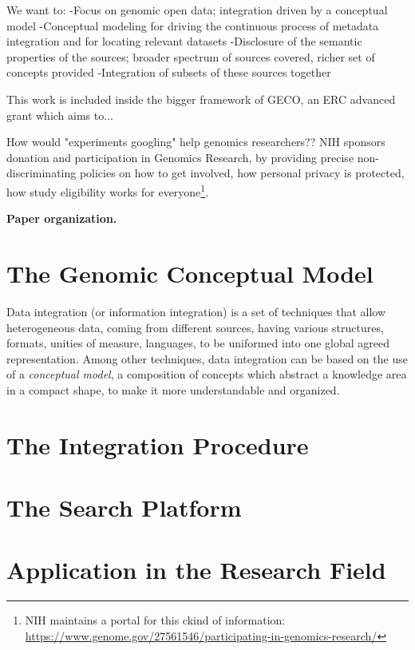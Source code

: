 \documentclass[journal]{IEEEtran}
\begin{document}
We want to:
-Focus on genomic open data; integration driven by a conceptual model
-Conceptual modeling for driving the continuous process of metadata integration and for locating relevant datasets
-Disclosure of the semantic properties of the sources; broader spectrum of sources covered, richer set of concepts provided
-Integration of subsets of these sources together

This work is included inside the bigger framework of GECO, an ERC advanced grant which aims to...

How would "experiments googling" help genomics researchers??
NIH sponsors donation and participation in Genomics Research, by providing precise non-discriminating policies on how to get involved, how personal privacy is protected, how study eligibility works for everyone\footnote{NIH maintains a portal for this ckind of information: \url{https://www.genome.gov/27561546/participating-in-genomics-research/}}.


\textbf{Paper organization.}




\section{The Genomic Conceptual Model}

Data integration (or information integration) is a set of techniques that allow heterogeneous data, coming from different sources, having various structures, formats, unities of measure, languages, to be uniformed into one global agreed representation.
Among other techniques, data integration can be based on the use of a \textit{conceptual model}, a composition of concepts which abstract a knowledge area in a compact shape, to make it more understandable and organized.



\section{The Integration Procedure}

\section{The Search Platform}

\section{Application in the Research Field}
\end{document}

